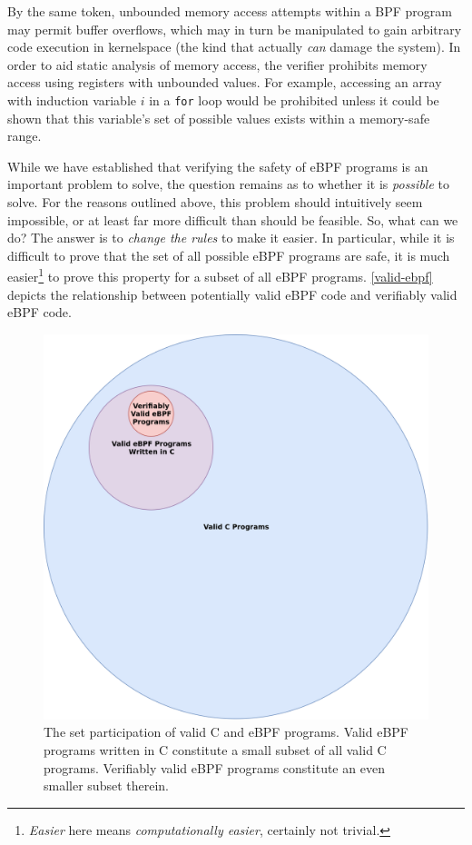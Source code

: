 \documentclass[
  12pt]{findlay}
\newcommand{\passthrough}[1]{#1}
\begin{document}
By the same token, unbounded memory access attempts within a BPF program
may permit buffer overflows, which may in turn be manipulated to gain
arbitrary code execution in kernelspace \autocite{chen11} (the kind that
actually \emph{can} damage the system). In order to aid static analysis
of memory access, the verifier prohibits memory access using registers
with unbounded values. For example, accessing an array with induction
variable \(i\) in a \passthrough{\lstinline!for!} loop would be
prohibited unless it could be shown that this variable's set of possible
values exists within a memory-safe range.

While we have established that verifying the safety of eBPF programs is
an important problem to solve, the question remains as to whether it is
\emph{possible} to solve. For the reasons outlined above, this problem
should intuitively seem impossible, or at least far more difficult than
should be feasible. So, what can we do? The answer is to \emph{change
the rules} to make it easier. In particular, while it is difficult to
prove that the set of all possible eBPF programs are safe, it is much
easier\footnote{\emph{Easier}
here means \emph{computationally easier}, certainly not trivial.} to
prove this property for a subset of all eBPF programs.
\autoref{valid-ebpf} depicts the relationship between potentially valid
eBPF code and verifiably valid eBPF code.

\begin{figure}[p]
    \caption[The set participation of valid C and eBPF programs.]{
        The set participation of valid C and eBPF programs.
        Valid eBPF programs written in C constitute a small subset of all valid C programs.
        Verifiably valid eBPF programs constitute an even smaller subset therein.
    }
    \label{valid-ebpf}
    \includegraphics[height=.4\textheight]{../figures/valid-ebpf.png}
\end{figure}
\end{document}
